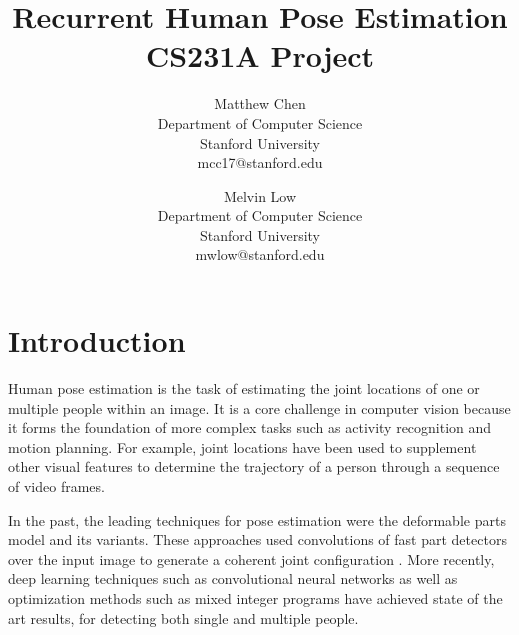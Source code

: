 \documentclass[11pt,twocolumn,letterpaper]{article}
\begin{document}
\title{Recurrent Human Pose Estimation \\ \small CS231A Project}
\author{Matthew Chen\\
  \small \vspace{-2mm} Department of Computer Science\\
  \small \vspace{-2mm} Stanford University\\
  \small mcc17@stanford.edu
  \and
  Melvin Low\\
  \small \vspace{-2mm} Department of Computer Science\\
  \small \vspace{-2mm} Stanford University\\
  \small mwlow@stanford.edu}

\date{}
\maketitle
\newcommand{\argmin}{\operatornamewithlimits{arg\,min}}
\newcommand{\argmax}{\operatornamewithlimits{arg\,max}}
\section{Introduction}

Human pose estimation is the task of estimating the joint locations of one or
multiple people within an image. It is a core challenge in computer vision because
it forms the foundation of more complex tasks such as activity recognition
and motion planning. For example, joint locations have been used to supplement
other visual features to determine the trajectory of a person through a sequence
of video frames.

In the past, the leading techniques for pose estimation were the deformable
parts model and its variants. These approaches used convolutions of fast
part detectors over the input image to generate a coherent 
joint configuration \cite{felzenszwalb2010object}.
More recently, deep learning techniques such as convolutional neural networks
as well as optimization methods such as mixed integer programs have 
achieved state of the art results, for detecting both single and multiple people.
\end{document}
